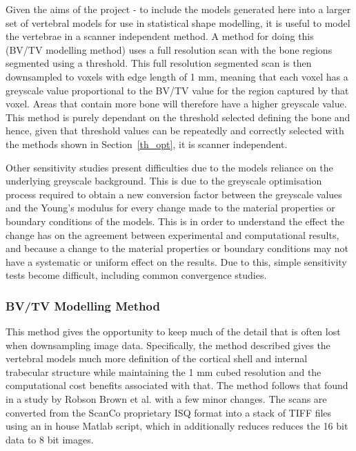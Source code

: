 Given the aims of the project - to include the models generated here into a
larger set of vertebral models for use in statistical shape modelling, it is
useful to model the vertebrae in a scanner independent method. A method for
doing this (BV/TV modelling method) uses a full resolution scan with the bone
regions segmented using a threshold. This full resolution segmented scan is then
downsampled to voxels with edge length of 1 mm, meaning that each voxel has a
greyscale value proportional to the BV/TV value for the region captured by that
voxel. Areas that contain more bone will therefore have a higher greyscale
value. This method is purely dependant on the threshold selected defining the
bone and hence, given that threshold values can be repeatedly and correctly
selected with the methods shown in Section~\ref{th_opt}, it is scanner independent.

Other sensitivity studies present difficulties due to the models reliance on the underlying greyscale background.
This is due to the greyscale optimisation process required to obtain a new conversion factor between the greyscale values and the Young's modulus for every change made to the material properties or boundary conditions of the models.
This is in order to understand the effect the change has on the agreement between experimental and computational results, and because a change to the material properties or boundary conditions may not have a systematic or uniform effect on the results.
Due to this, simple sensitivity tests become difficult, including common convergence studies.

\subsubsection{BV/TV Modelling Method}\label{bvtv_method}

This method gives the opportunity to keep much of the detail that is often lost when downsampling image data.
Specifically, the method described gives the vertebral models much more definition of the cortical shell and internal trabecular structure while maintaining the 1 mm cubed resolution and the computational cost benefits associated with that.
The method follows that found in a study by Robson Brown et al.
\cite{RobsonBrown2014} with a few minor changes. The scans are converted from the ScanCo proprietary ISQ format into a stack of TIFF files using an in house Matlab script, which in additionally reduces reduces the 16 bit data to 8 bit images.

